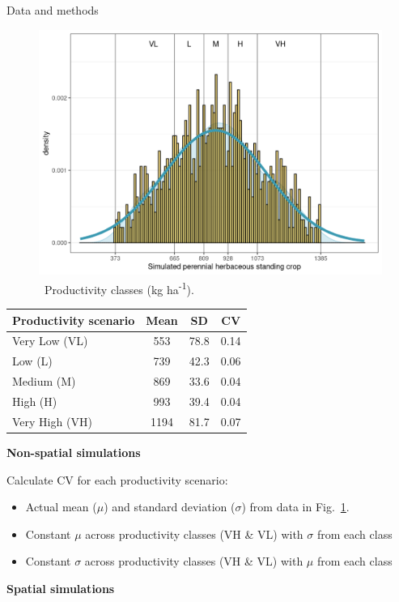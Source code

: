 \begin{frame}[t]
\begin{columns}[t]
\begin{column}{\twocolwid}
\begin{columns}[T]
\begin{column}{0.4\textwidth}
\begin{alertblock}{Data and methods}
{\begin{center}
\begin{figure}
			\includegraphics[]{figure/NonSpatialData}
			\caption{~Productivity classes (kg ha\textsuperscript{-1}).}
			\label{productivity}
		\end{figure}
		\begin{tabular}{l ccc}
			\toprule
			\textbf{Productivity scenario} & \textbf{Mean} & \textbf{SD} & \textbf{CV}  \\ \midrule
			Very Low (VL)	&	553 & 78.8 & 	0.14 \\
			Low (L) &	739 &	42.3 &	0.06 \\
			Medium (M) &	869 & 33.6 &	0.04 \\
			High (H) &	993 &	39.4 &	0.04\\
			Very High (VH) & 1194 & 81.7 & 0.07 \\ \bottomrule
		\end{tabular}
	\end{center}
	\textbf{Non-spatial simulations}
	
	Calculate CV for each productivity scenario:
	\begin{itemize}
		\item Actual mean ($\mu$) and standard deviation ($\sigma$) from data in Fig.~\ref{productivity}. 
		\item Constant $\mu$ across productivity classes (VH \& VL) with $\sigma$ from each class
		\item Constant $\sigma$ across productivity classes (VH \& VL) with $\mu$ from each class
	\end{itemize}
\textbf{Spatial simulations}

}
\end{alertblock}
\end{column}
\end{columns}
\end{column}
\end{columns}
\end{frame}
